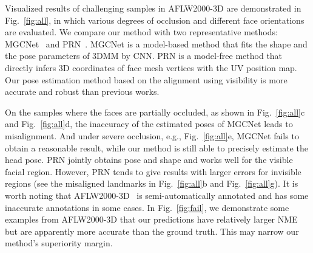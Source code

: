 \documentclass[journal]{IEEEtran}
\begin{document}
	Visualized results of challenging samples in AFLW2000-3D are demonstrated in Fig.~\ref{fig:all}, in which various degrees of occlusion and different face orientations are evaluated. We compare our method with two representative methods: MGCNet~\cite{MGC} and PRN~\cite{PRN}. MGCNet is a model-based method that fits the shape and the pose parameters of 3DMM by CNN. PRN is a model-free method that directly infers 3D coordinates of face mesh vertices with the UV position map.
	Our pose estimation method based on the alignment using visibility is more accurate and robust than previous works.
	
	On the samples where the faces are partially occluded, as shown in Fig.~\ref{fig:all}c and Fig.~\ref{fig:all}d,
	the inaccuracy of the estimated poses of MGCNet leads to misalignment. And under severe occlusion, e.g., Fig.~\ref{fig:all}e, MGCNet fails to obtain a reasonable result, while our method is still able to precisely estimate the head pose. PRN jointly obtains pose and shape and works well for the visible facial region. However, PRN tends to give results with larger errors for invisible regions (see the misaligned landmarks in Fig.~\ref{fig:all}b and Fig.~\ref{fig:all}g).
	It is worth noting that AFLW2000-3D~\cite{3DDFA} is semi-automatically annotated and has some
	inaccurate annotations in some cases.
	In Fig.~\ref{fig:fail}, we demonstrate some examples from AFLW2000-3D that our predictions have relatively larger NME but are apparently more accurate than the ground truth. This may narrow our method's superiority margin.
	
\end{document}
